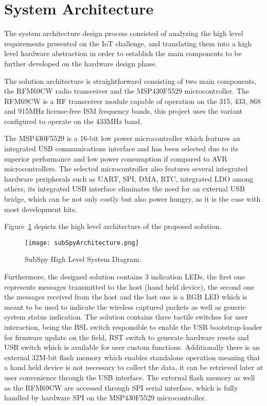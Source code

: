 \documentclass[12pt]{article}
\begin{document}
\section{System Architecture}
\label{systemArch}

The system architecture design process consisted of analysing the high level requirements presented on the IoT challenge, and translating them into a high level hardware abstraction in order to establish the main components to be further developed on the hardware design phase.

The solution architecture is straightforward consisting of two main components, the RFM69CW radio transceiver and the MSP430F5529 microcontroller. The RFM69CW is a RF transceiver module capable of operation on the 315, 433, 868 and 915MHz license-free ISM frequency bands, this project uses the variant configured to operate on the 433MHz band. 

The MSP430F5529 is a 16-bit low power microcontroller which features an integrated USB communications interface and has been selected due to its superior performance and low power consumption if compared to AVR microcontrollers. The selected microcontroller also features several integrated hardware peripherals such as UART, SPI, DMA, RTC, integrated LDO among others, its integrated USB interface eliminates the need for an external USB bridge, which can be not only costly but also power hungry, as it is the case with most development kits.

\newpage
Figure~\ref{fig:subSpyArchitecture} depicts the high level architecture of the proposed solution.

\begin{figure}[H]
    \centering
    \texttt{[image: subSpyArchitecture.png]}
    \caption{SubSpy High Level System Diagram.}
    \label{fig:subSpyArchitecture}
\end{figure}

Furthermore, the designed solution contains 3 indication LEDs, the first one represents messages transmitted to the host (hand held device), the second one the messages received from the host and the last one is a RGB LED which is meant to be used to indicate the wireless captured packets as well as generic system status indication.
The solution contains three tactile switches for user interaction, being the BSL switch responsible to enable the USB bootstrap-loader for firmware update on the field, RST switch to generate hardware resets and USR switch which is available for user custom functions. Additionally there is an external 32M-bit  flash memory which enables standalone operation meaning that a hand held device is not necessary to collect the data, it can be retrieved later at user convenience through the USB interface.
The external flash memory as well as the RFM69CW are accessed through SPI serial interface, which is fully handled by hardware SPI on the MSP430F5529 microcontroller.
\end{document}
